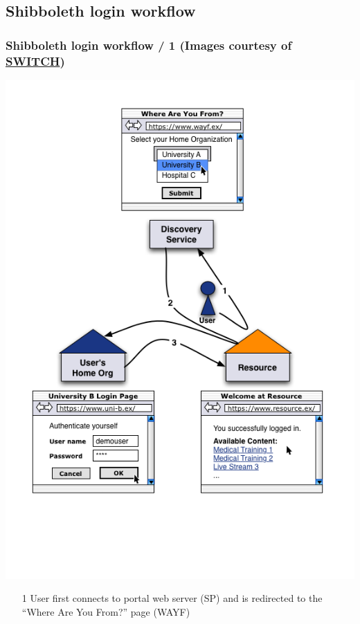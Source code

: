 \documentclass{beamer}
\newcommand{\+}{\vspace{1em}}
\begin{document}
\subsection{Shibboleth login workflow}

\begin{frame}[label=more-shib]
  \frametitle{Shibboleth login workflow / 1
    \hfill%
    {\tiny (Images courtesy of 
      \href{http://www.switch.ch/aai/demo/2/medium.html}{SWITCH})}
  }
  \begin{center}
    \includegraphics[height=0.66\textheight]{simple_complete}
  \end{center}
  \begin{enumerate}
  \item[1] User first connects to portal web server (SP) and is
    redirected to the ``Where Are You From?'' page (WAYF)
  \end{enumerate}
\end{frame}
\end{document}
